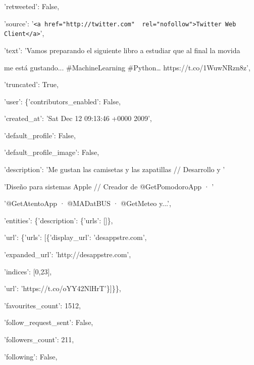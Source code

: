 \quad'retweeted': False,

\quad'source': '\verb|<a href="http://twitter.com"  rel="nofollow">Twitter Web Client</a>|',

\quad'text': 'Vamos preparando el siguiente libro a estudiar que al final la movida 

\hspace{1.7cm}me está gustando... \#MachineLearning \#Python… https://t.co/1WuwNRzn8z',

\quad'truncated': True,

\quad'user': \{'contributors\_enabled': False,

\hspace{1.7cm}'created\_at': 'Sat Dec 12 09:13:46 +0000 2009',

\hspace{1.7cm}'default\_profile': False,

\hspace{1.7cm}'default\_profile\_image': False,

\hspace{1.7cm}'description': 'Me gustan las camisetas y las  zapatillas // Desarrollo y '

\hspace{3cm}'Diseño para sistemas Apple //  Creador de @GetPomodoroApp ·  '

\hspace{3cm}'@GetAtentoApp · @MADatBUS ·  @GetMeteo y...',

\hspace{1.7cm}'entities': \{'description': \{'urls': []\},

\hspace{3.5cm}'url': \{'urls': [\{'display\_url': 'desappstre.com',

\hspace{4.5cm}'expanded\_url': 'http://desappstre.com',

\hspace{4.5cm}'indices': [0,23],

\hspace{4.5cm}'url': 'https://t.co/oYY42NlHrT'\}]\}\},

\hspace{1.7cm}'favourites\_count': 1512,

\hspace{1.7cm}'follow\_request\_sent': False,

\hspace{1.7cm}'followers\_count': 211,

\hspace{1.7cm}'following': False,


